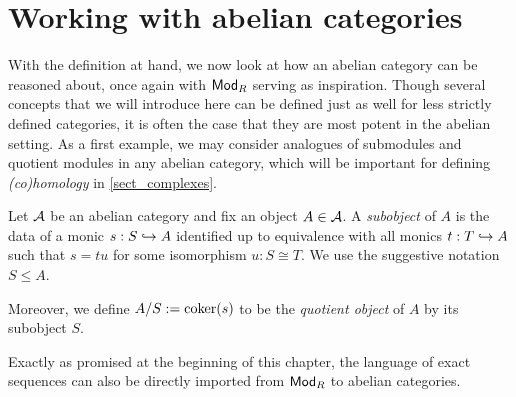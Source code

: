 \section{Working with abelian categories}

With the definition at hand, we now look at how an abelian category
can be reasoned about, once again with ${\mathsf{Mod}}_{{R}}$ serving as inspiration.
Though several concepts that we will introduce here can be defined
just as well for less strictly defined categories, it is often the
case that they are most potent in the abelian setting.
As a first example, we may consider analogues of submodules and
quotient modules in any abelian category, which will be important for
defining \emph{(co)homology} in \cref{sect_complexes}.

\begin{definition}
  Let $\mathcal{A}$ be an abelian category and fix an object $A \in \mathcal{A}$.
  A \emph{subobject} of $A$ is the data of a monic $s: S \hookrightarrow A$
  identified up to equivalence with all monics $t: T \hookrightarrow A$ such
  that $s = t u$ for some isomorphism $u: S \cong T$.
  We use the suggestive notation $S \leq A$.
  \iffalse
  \fi
  Moreover, we define $A/S := \operatorname{coker}(s)$ to be the \emph{quotient
  object} of $A$ by its subobject $S$.
\end{definition}

Exactly as promised at the beginning of this chapter, the language of
exact sequences can also be directly imported from ${\mathsf{Mod}}_{{R}}$ to
abelian categories.


